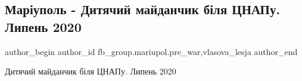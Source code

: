  
 
 
 
 

\subsection{Маріуполь - Дитячий майданчик біля ЦНАПу. Липень 2020}
\label{sec:15_01_2023.fb.fb_group.mariupol.pre_war.2.mar_upol___dityachii}
 
\ifcmt
 author_begin
   author_id fb_group.mariupol.pre_war,vlasova_lesja
 author_end
\fi

Дитячий майданчик біля ЦНАПу. Липень 2020
